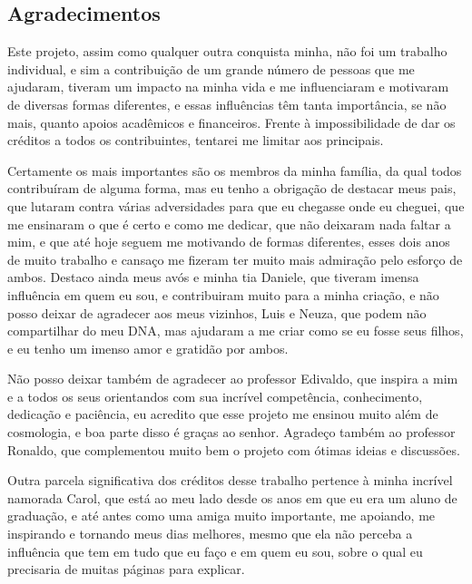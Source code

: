 \documentclass[openany,a4paper,12pt,oneside]{book}
\begin{document}
\begingroup
{}
\begin{spacing}{1.5}
\chapter*{Agradecimentos}
Este projeto, assim como qualquer outra conquista minha, não foi um trabalho individual, e sim a contribuição de um grande número de pessoas que me ajudaram, tiveram um impacto na minha vida e me influenciaram e motivaram de diversas formas diferentes, e essas influências têm tanta importância, se não mais, quanto apoios acadêmicos e financeiros. Frente à impossibilidade de dar os créditos a todos os contribuintes, tentarei me limitar aos principais.

Certamente os mais importantes são os membros da minha família, da qual todos contribuíram de alguma forma, mas eu tenho a obrigação de destacar meus pais, que lutaram contra várias adversidades para que eu chegasse onde eu cheguei, que me ensinaram o que é certo e como me dedicar, que não deixaram nada faltar a mim, e que até hoje seguem me motivando de formas diferentes, esses dois anos de muito trabalho e cansaço me fizeram ter muito mais admiração pelo esforço de ambos. Destaco ainda meus avós e minha tia Daniele, que tiveram imensa influência em quem eu sou, e contribuiram muito para a minha criação, e não posso deixar de agradecer aos meus vizinhos, Luis e Neuza, que podem não compartilhar do meu DNA, mas ajudaram a me criar como se eu fosse seus filhos, e eu tenho um imenso amor e gratidão por ambos.

Não posso deixar também de agradecer ao professor Edivaldo, que inspira a mim e a todos os seus orientandos com sua incrível competência, conhecimento, dedicação e paciência, eu acredito que esse projeto me ensinou muito além de cosmologia, e boa parte disso é graças ao senhor. Agradeço também ao professor Ronaldo, que complementou muito bem o projeto com ótimas ideias e discussões.

Outra parcela significativa dos créditos desse trabalho pertence à minha incrível namorada Carol, que está ao meu lado desde os anos em que eu era um aluno de graduação, e até antes como uma amiga muito importante, me apoiando, me inspirando e tornando meus dias melhores, mesmo que ela não perceba a influência que tem em tudo que eu faço e em quem eu sou, sobre o qual eu precisaria de muitas páginas para explicar.


\end{spacing}
\end{document}
